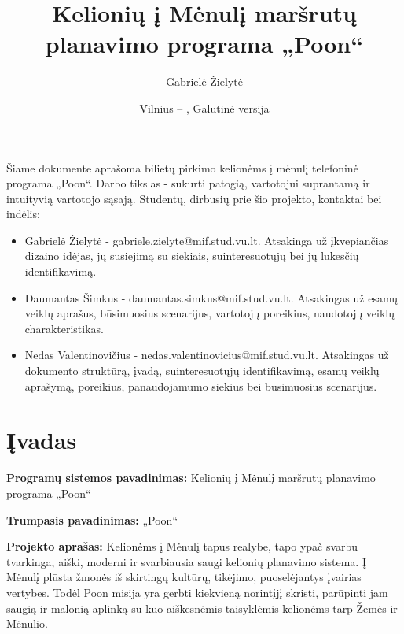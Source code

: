 \documentclass{VUMIFPSkursinis}
\title{Kelionių į Mėnulį maršrutų planavimo programa „Poon“}
\author{Gabrielė Žielytė}
\date{Vilnius – \the\year, Galutinė versija}
\begin{document}
	
\maketitle

\thispagestyle{empty}
\tableofcontents


Šiame dokumente aprašoma bilietų pirkimo kelionėms į mėnulį telefoninė programa „Poon“. Darbo tikslas - sukurti patogią, vartotojui suprantamą ir intuityvią vartotojo sąsają.
Studentų, dirbusių prie šio projekto, kontaktai bei indėlis:
\begin{itemize}
\item Gabrielė Žielytė - gabriele.zielyte@mif.stud.vu.lt. Atsakinga už įkvepiančias dizaino idėjas, jų susiejimą su siekiais, suinteresuotųjų bei jų lukesčių identifikavimą.
\item Daumantas Šimkus - daumantas.simkus@mif.stud.vu.lt. Atsakingas už esamų veiklų aprašus, būsimuosius scenarijus, vartotojų poreikius, naudotojų veiklų charakteristikas.
\item Nedas Valentinovičius - nedas.valentinovicius@mif.stud.vu.lt. Atsakingas už dokumento struktūrą, įvadą, suinteresuotųjų identifikavimą, esamų veiklų aprašymą, poreikius, panaudojamumo siekius bei būsimuosius scenarijus.
\end{itemize}
\thispagestyle{empty}

\cleardoublepage{}
\setcounter{page}{4}

\section{Įvadas}
\textbf{Programų sistemos pavadinimas: } Kelionių į Mėnulį maršrutų planavimo programa „Poon“
\bigskip

\textbf{Trumpasis pavadinimas: } „Poon“
\bigskip




\textbf{Projekto aprašas: } Kelionėms į Mėnulį tapus realybe, tapo ypač svarbu tvarkinga, aiški, moderni ir svarbiausia saugi kelionių planavimo sistema. Į Mėnulį plūsta žmonės iš skirtingų kultūrų, tikėjimo, puoselėjantys įvairias vertybes. Todėl Poon misija yra gerbti kiekvieną norintįjį skristi, parūpinti jam saugią ir malonią aplinką su kuo aiškesnėmis taisyklėmis kelionėms tarp Žemės ir Mėnulio.
\end{document}
